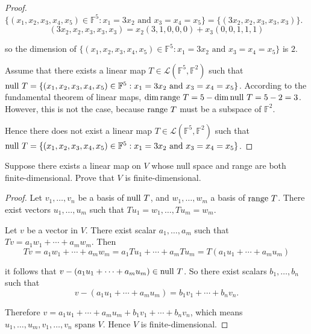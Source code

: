 \begin{proof}
    $\{(x_{1} , x_{2} , x_{3} , x_{4} , x_{5} ) \in \mathbb{F}^{5} : x_{1} = 3x_{2} \text{ and } x_{3} = x_{4} = x_{5} \} = \{ (3x_{2}, x_{2}, x_{3}, x_{3}, x_{3}) \}$.
    \[
        (3x_{2}, x_{2}, x_{3}, x_{3}, x_{3}) = x_{2}(3, 1, 0, 0, 0) + x_{3}(0, 0, 1, 1, 1)
    \]

    so the dimension of $\{(x_{1} , x_{2} , x_{3} , x_{4} , x_{5} ) \in \mathbb{F}^{5} : x_{1} = 3x_{2} \text{ and } x_{3} = x_{4} = x_{5} \}$ is $2$.

    Assume that there exists a linear map $T\in\mathcal{L}(\mathbb{F}^{5}, \mathbb{F}^{2})$ such that $\operatorname{null}\,{T} = \{(x_{1} , x_{2} , x_{3} , x_{4} , x_{5} ) \in \mathbb{F}^{5} : x_{1} = 3x_{2} \text{ and } x_{3} = x_{4} = x_{5} \}$. According to the fundamental theorem of linear maps, $\dim\operatorname{range}\,{T} = 5 - \dim\operatorname{null}\,{T} = 5 - 2 = 3$. However, this is not the case, because $\operatorname{range}\,{T}$ must be a subspace of $\mathbb{F}^{2}$.

    Hence there does not exist a linear map $T\in\mathcal{L}(\mathbb{F}^{5}, \mathbb{F}^{2})$ such that $\operatorname{null}\,{T} = \{(x_{1} , x_{2} , x_{3} , x_{4} , x_{5} ) \in \mathbb{F}^{5} : x_{1} = 3x_{2} \text{ and } x_{3} = x_{4} = x_{5} \}$.
\end{proof}
\newpage

\begin{exercise}\label{chapter3:sectionB:exercise15}
    Suppose there exists a linear map on $V$ whose null space and range are both finite-dimensional. Prove that $V$ is finite-dimensional.
\end{exercise}

\begin{proof}
    Let $v_{1}, \ldots, v_{n}$ be a basis of $\operatorname{null}\,{T}$, and $w_{1}, \ldots, w_{m}$ a basis of $\operatorname{range}\,{T}$. There exist vectors $u_{1}, \ldots, u_{m}$ such that $Tu_{1} = w_{1}, \ldots, Tu_{m} = w_{m}$.

    Let $v$ be a vector in $V$. There exist scalar $a_{1}, \ldots, a_{m}$ such that $Tv = a_{1}w_{1} + \cdots + a_{m}w_{m}$. Then
    \[
        Tv = a_{1}w_{1} + \cdots + a_{m}w_{m} = a_{1}Tu_{1} + \cdots + a_{m}Tu_{m} = T(a_{1}u_{1} + \cdots + a_{m}u_{m})
    \]

    it follows that $v - (a_{1}u_{1} + \cdots + a_{m}u_{m})\in \operatorname{null}\,{T}$. So there exist scalars $b_{1}, \ldots, b_{n}$ such that
    \[
        v - (a_{1}u_{1} + \cdots + a_{m}u_{m}) = b_{1}v_{1} + \cdots + b_{n}v_{n}.
    \]

    Therefore $v = a_{1}u_{1} + \cdots + a_{m}u_{m} + b_{1}v_{1} + \cdots + b_{n}v_{n}$, which means $u_{1}, \ldots, u_{m}, v_{1}, \ldots, v_{n}$ spans $V$. Hence $V$ is finite-dimensional.
\end{proof}
\newpage


